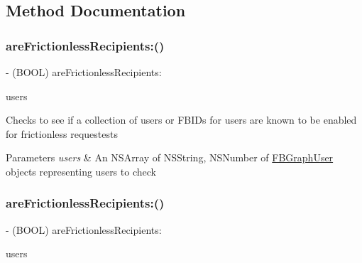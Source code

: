\subsection{Method Documentation}
\mbox{\label{interfaceFBFrictionlessRecipientCache_a8a6dcc263fb784a4a00fcd37a6a47ca6}} 
\subsubsection{\texorpdfstring{are\+Frictionless\+Recipients\+:()}{areFrictionlessRecipients:()}\hspace{0.1cm}{\footnotesize\ttfamily [1/5]}}
{\footnotesize\ttfamily -\/ (B\+O\+OL) are\+Frictionless\+Recipients\+: \begin{DoxyParamCaption}\item[{(N\+S\+Array $\ast$)}]{users }\end{DoxyParamCaption}}

Checks to see if a collection of users or F\+B\+I\+Ds for users are known to be enabled for frictionless requestests


\begin{DoxyParams}{Parameters}
{\em users} & An N\+S\+Array of N\+S\+String, N\+S\+Number of {\ttfamily \hyperlink{protocolFBGraphUser-p}{F\+B\+Graph\+User}} objects representing users to check \\
\hline
\end{DoxyParams}
\mbox{\label{interfaceFBFrictionlessRecipientCache_a8a6dcc263fb784a4a00fcd37a6a47ca6}} 
\subsubsection{\texorpdfstring{are\+Frictionless\+Recipients\+:()}{areFrictionlessRecipients:()}\hspace{0.1cm}{\footnotesize\ttfamily [2/5]}}
{\footnotesize\ttfamily -\/ (B\+O\+OL) are\+Frictionless\+Recipients\+: \begin{DoxyParamCaption}\item[{(N\+S\+Array $\ast$)}]{users }\end{DoxyParamCaption}}

